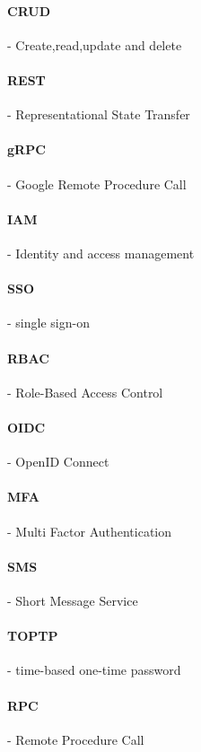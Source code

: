 \paragraph{CRUD} - Create,read,update and delete

\paragraph{REST} - Representational State Transfer

\paragraph{gRPC} - Google Remote Procedure Call

\paragraph{IAM} - Identity and access management

\paragraph{SSO} - single sign-on

\paragraph{RBAC} - Role-Based Access Control

\paragraph{OIDC} - OpenID Connect 

\paragraph{MFA} - Multi Factor Authentication

\paragraph{SMS} - Short Message Service

\paragraph{TOPTP} - time-based one-time password

\paragraph{RPC} - Remote Procedure Call

